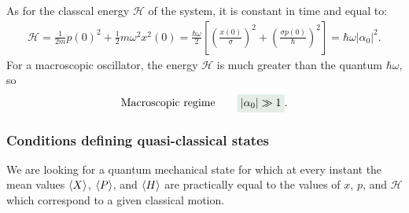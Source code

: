 As for the classcal energy $\mathcal{H}$ of the system, it is constant in time and equal to:
\begin{align*}
    \mathcal{H}=\frac{1}{2m}p(0)^2+\frac{1}{2}m\omega^2x^2(0)=\frac{\hbar\omega}{2}\left[\left(\frac{x(0)}{\sigma}\right)^2+\left(\frac{\sigma p(0)}{\hbar}\right)^2\right]=\hbar\omega|\alpha_0|^2.
\end{align*}
For a macroscopic oscillator, the energy $\mathcal{H}$ is much greater than the quantum $\hbar\omega$, so 
\begin{align}
    \text{Macroscopic regime}\qquad\highlight{|\alpha_0|\gg1}.
\end{align}


%
\subsubsection{Conditions defining quasi-classical states}
We are looking for a quantum mechanical state for which at every instant the mean values $\langle X\rangle$, $\langle P\rangle$, and $\langle H\rangle$ are practically equal to the values of 
$x$, $p$, and $\mathcal{H}$ which correspond to a given classical motion.

